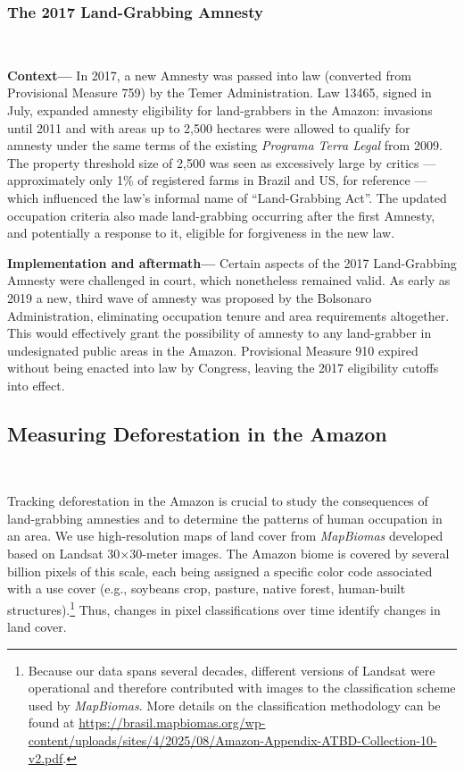 \documentclass[12pt]{article}
\begin{document}
\subsubsection{The 2017 Land-Grabbing Amnesty}
\ 

\quad \textbf{Context---} In 2017, a new Amnesty was passed into law (converted from Provisional Measure 759) by the Temer Administration. Law 13465, signed in July, expanded amnesty eligibility for land-grabbers in the Amazon: invasions until 2011 and with areas up to 2,500 hectares were allowed to qualify for amnesty under the same terms of the existing \textit{Programa Terra Legal} from 2009. The property threshold size of 2,500 was seen as excessively large by critics --- approximately only 1\% of registered farms in Brazil and US, for reference --- which influenced the law's informal name of ``Land-Grabbing Act''. The updated occupation criteria also made land-grabbing occurring after the first Amnesty, and potentially a response to it, eligible for forgiveness in the new law.
\

\quad \textbf{Implementation and aftermath---} Certain aspects of the 2017 Land-Grabbing Amnesty were challenged in court, which nonetheless remained valid. As early as 2019 a new, third wave of amnesty was proposed by the Bolsonaro Administration, eliminating occupation tenure and area requirements altogether. This would effectively grant the possibility of amnesty to any land-grabber in undesignated public areas in the Amazon. Provisional Measure 910 expired without being enacted into law by Congress, leaving the 2017 eligibility cutoffs into effect. 


\subsection{Measuring Deforestation in the Amazon}
\

\quad Tracking deforestation in the Amazon is crucial to study the consequences of land-grabbing amnesties and to determine the patterns of human occupation in an area. We use high-resolution maps of land cover from \textit{MapBiomas} developed based on Landsat 30$\times$30-meter images. The Amazon biome is covered by several billion pixels of this scale, each being assigned a specific color code associated with a use cover (e.g., soybeans crop, pasture, native forest, human-built structures).\footnote{Because our data spans several decades, different versions of Landsat were operational and therefore contributed with images to the classification scheme used by \textit{MapBiomas}. More details on the classification methodology can be found at \href{https://brasil.mapbiomas.org/wp-content/uploads/sites/4/2025/08/Amazon-Appendix-ATBD-Collection-10-v2.pdf}{https://brasil.mapbiomas.org/wp-content/uploads/sites/4/2025/08/Amazon-Appendix-ATBD-Collection-10-v2.pdf}.} Thus, changes in pixel classifications over time identify changes in land cover.
\ 
\end{document}
